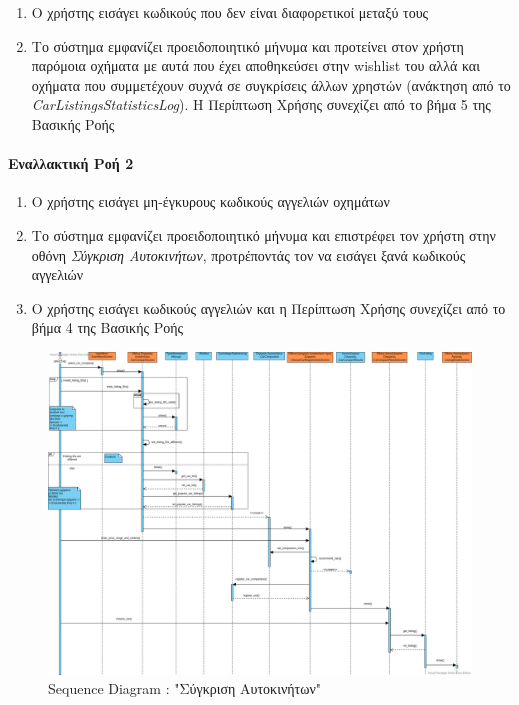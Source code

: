 \documentclass{../ol-softwaremanual}
\begin{document}
	\begin{enumerate}
		\item Ο χρήστης εισάγει κωδικούς που δεν είναι διαφορετικοί μεταξύ τους
		\item Το σύστημα εμφανίζει προειδοποιητικό μήνυμα και προτείνει στον χρήστη παρόμοια οχήματα με αυτά που έχει αποθηκεύσει στην \en wishlist \gr του αλλά και οχήματα που συμμετέχουν συχνά σε συγκρίσεις άλλων χρηστών (ανάκτηση από το \en \textit{CarListingsStatisticsLog}\gr). Η Περίπτωση Χρήσης συνεχίζει από το βήμα 5 της Βασικής Ροής
	\end{enumerate}
	
	\paragraph{Εναλλακτική Ροή 2}
	\begin{enumerate}
		\item Ο χρήστης εισάγει μη-έγκυρους κωδικούς αγγελιών οχημάτων
		\item Το σύστημα εμφανίζει προειδοποιητικό μήνυμα και επιστρέφει τον χρήστη στην οθόνη \textit{Σύγκριση Αυτοκινήτων}, προτρέποντάς τον να εισάγει ξανά κωδικούς αγγελιών
		\item Ο χρήστης εισάγει κωδικούς αγγελιών και η Περίπτωση Χρήσης συνεχίζει από το βήμα 4 της Βασικής Ροής		
	\end{enumerate}
	
	
	\begin{figure}[htbp!]
		\centering
		\includegraphics[scale=0.255]{img/seq_car_compare.png}
		\caption{\en Sequence Diagram : "\gr Σύγκριση Αυτοκινήτων\en"\gr}
	\end{figure}
	
\end{document}
